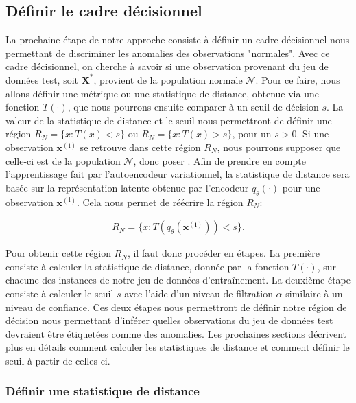 \subsection{Définir le cadre décisionnel} \label{cadre_decisionnel}

La prochaine étape de notre approche consiste à définir un cadre décisionnel nous permettant de discriminer les anomalies des observations "normales". Avec ce cadre décisionnel, on cherche à savoir si une observation provenant du jeu de données test, soit $\boldsymbol{X}^{*}$, provient de la population normale $\mathcal{N}$. Pour ce faire, nous allons définir une métrique ou une statistique de distance, obtenue via une fonction $T(\cdot)$, que nous pourrons ensuite comparer à un seuil de décision $s$. La valeur de la statistique de distance et le seuil nous permettront de définir une région $R_{N}=\{x :T(x)<s\}$ ou $R_{N}=\{x :T(x)>s\}$, pour un $s>0$. Si une observation $\boldsymbol{x^{(i)}}$ se retrouve dans cette région $R_{N}$, nous pourrons supposer que celle-ci est de la population $\mathcal{N}$, donc poser \DIFdelbegin {}\DIFdelend \DIFaddbegin {}\DIFaddend . Afin de prendre en compte l'apprentissage fait par l'autoencodeur variationnel, la statistique de distance sera \DIFdelbegin {}\DIFdelend basée sur la représentation latente obtenue par l'encodeur $q_\theta(\cdot)$ pour une observation $\boldsymbol{x^{(i)}}$. Cela nous permet de réécrire la région $R_N$:

\begin{gather}  \label{eq:region}
R_{N}=\{x :T(q_\theta(\boldsymbol{x^{(i)}}))<s\}.
\end{gather}

Pour obtenir cette région $R_N$, il faut donc procéder en \DIFdelbegin {}\DIFdelend \DIFaddbegin {}\DIFaddend étapes. La première consiste à calculer la statistique de distance, donnée par la fonction $T(\cdot)$, sur chacune des instances de notre jeu de données d'entraînement. La deuxième étape consiste à calculer le seuil $s$ avec l'aide d'un niveau de filtration $\alpha$ similaire à un niveau de confiance. Ces deux étapes nous permettront de définir notre région de décision nous permettant d'inférer quelles observations du jeu de données test devraient être étiquetées comme des anomalies. Les prochaines sections décrivent plus en détails comment calculer les statistiques de distance et comment définir le seuil à partir de celles-ci.

\subsubsection{Définir une statistique de distance}

